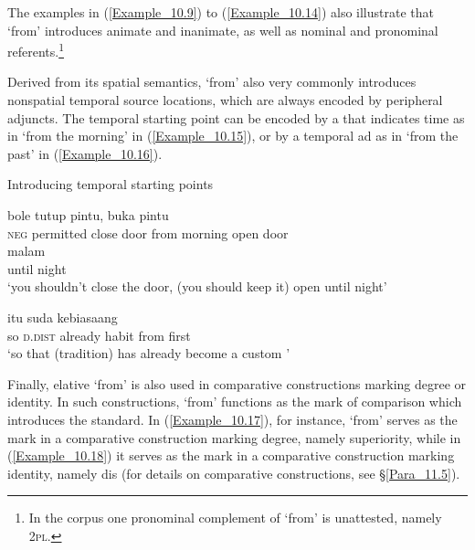 The examples in (\ref{Example_10.9}) to (\ref{Example_10.14}) also illustrate that  ‘from’ introduces animate and inanimate, as well as nominal and pronominal referents.\footnote{In the corpus one pronominal complement of  ‘from’ is unattested, namely \textsc{2pl}.}



Derived from its spatial semantics,  ‘from’ also very commonly introduces nonspatial temporal source locations, which are always encoded by peripheral adjuncts. The temporal starting point can be encoded by a  that indicates time as in  ‘from the morning’ in (\ref{Example_10.15}), or by a temporal ad as in  ‘from the past’ in (\ref{Example_10.16}).


\begin{styleExampleTitle}
Introducing temporal starting points
\end{styleExampleTitle}

\ea
\label{Example_10.15}
 {{bole}} {tutup} {pintu,} {} {} {buka} {pintu}\\ %
 \textsc{neg}  {permitted}  close  door  from  morning  open  door\\
  {malam}\\
 {until}  {night}\\
\glt 
‘you shouldn’t close the door, (you should keep it) open  until night’ \textstyleExampleSource{[081110-008-CvNP.0108]}
\z

\ea
\label{Example_10.16}
 {itu} {suda} {kebiasaang} {} {}\\ %
 so  \textsc{d.dist}  already  habit  from  first\\
\glt 
‘so that (tradition) has already become a custom ’ \textstyleExampleSource{[081014-007-CvEx.0063]}
\z


Finally, elative  ‘from’ is also used in comparative constructions marking degree or identity. In such constructions,  ‘from’ functions as the mark of comparison which introduces the standard. In (\ref{Example_10.17}), for instance,  ‘from’ serves as the mark in a comparative construction marking degree, namely superiority, while in (\ref{Example_10.18}) it serves as the mark in a comparative construction marking identity, namely dis (for details on comparative constructions, see §\ref{Para_11.5}).


